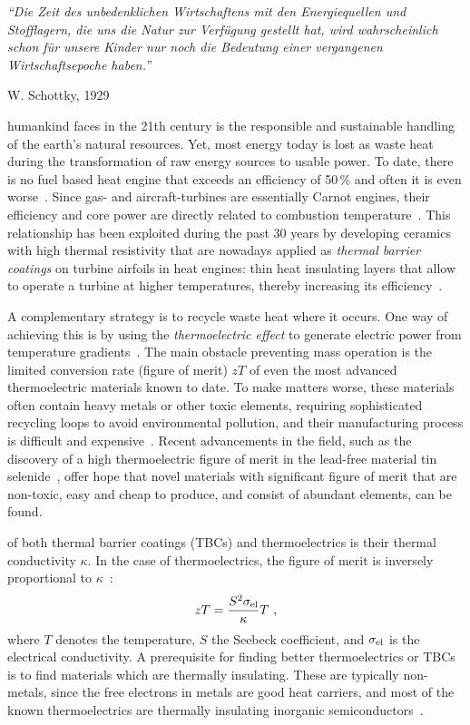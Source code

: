 \epigraph{\singlespacing \it ``Die Zeit des unbedenklichen Wirtschaftens mit den Energiequellen und Stofflagern, die uns die Natur zur Verfügung gestellt hat, wird wahrscheinlich schon für unsere Kinder nur noch die Bedeutung einer vergangenen Wirtschaftsepoche haben.''}{W. Schottky, 1929~\cite{Schottky1929}}
 humankind faces in the 21th century is the responsible and sustainable handling of the earth's natural resources.  Yet, most energy today is lost as waste heat during the transformation of raw energy sources to usable power. To date, there is no fuel based heat engine that exceeds an efficiency of 50\,\% and often it is even worse~\cite{eia}. 
Since gas- and aircraft-turbines are essentially Carnot engines, their efficiency and core power are directly related to combustion temperature~\cite{Clarke.2012,Perepezko.2009}. This relationship has been exploited during the past 30 years by developing 
ceramics with high thermal resistivity that are nowadays applied as \emph{thermal barrier coatings} on turbine airfoils in heat engines: thin heat insulating layers that allow to operate a turbine at higher temperatures, thereby increasing its efficiency~\cite{Clarke.2003}.

A complementary strategy is to recycle waste heat where it occurs. One way of achieving this is by using the \emph{thermoelectric effect} to  generate electric power from temperature gradients~\cite{Snyder.2008}. The main obstacle preventing mass operation is the limited conversion rate (figure of merit) $zT$ of even the most advanced thermoelectric materials known to date. To make matters worse, these materials often contain heavy metals or other toxic elements, requiring sophisticated recycling loops to avoid environmental pollution, and their manufacturing process is difficult and expensive~\cite{Nolas2001}. Recent advancements in the field, such as the discovery of a high thermoelectric figure of merit in the lead-free material tin selenide~\cite{Zhao.2014}, offer hope that novel materials with significant figure of merit that are non-toxic, easy and cheap to produce, and consist of abundant elements, can be found.

 of both thermal barrier coatings (TBCs) and thermoelectrics is their thermal conductivity $\kappa$. In the case of thermoelectrics, the figure of merit is inversely proportional to $\kappa$~\cite{Nolas2001}:
\begin{align}
zT = \frac{S^2 \sigma_{\rm el}}{\kappa} T~,
\label{eq:zT}
\end{align} 
where $T$ denotes the temperature, $S$ the Seebeck coefficient, and $\sigma_{\rm el}$ is the electrical conductivity.
A prerequisite for finding better thermoelectrics or TBCs is to find materials which are thermally insulating. These are typically non-metals, since the free electrons in metals are good heat carriers, and most of the known thermoelectrics are thermally insulating inorganic semiconductors~\cite[p.\,15]{Nolas2001}.

